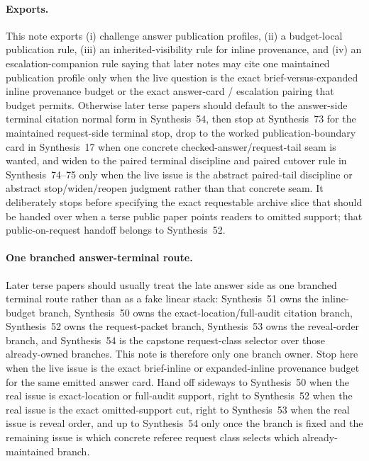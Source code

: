 \documentclass[11pt]{article}
\begin{document}
\paragraph{Exports.}
This note exports (i) challenge answer publication profiles, (ii) a budget-local publication rule, (iii) an inherited-visibility rule for inline provenance, and (iv) an escalation-companion rule saying that later notes may cite one maintained publication profile only when the live question is the exact brief-versus-expanded inline provenance budget or the exact answer-card / escalation pairing that budget permits. Otherwise later terse papers should default to the answer-side terminal citation normal form in Synthesis~54, then stop at Synthesis~73 for the maintained request-side terminal stop, drop to the worked publication-boundary card in Synthesis~17 when one concrete checked-answer/request-tail seam is wanted, and widen to the paired terminal discipline and paired cutover rule in Synthesis~74--75 only when the live issue is the abstract paired-tail discipline or abstract stop/widen/reopen judgment rather than that concrete seam. It deliberately stops before specifying the exact requestable archive slice that should be handed over when a terse public paper points readers to omitted support; that public-on-request handoff belongs to Synthesis~52.\cite{series:challengeanswerreviewmenus,series:publicrequestresponsepacketrefreshresponsepacketclosureverdicts,series:pairedterminalcitationdiscipline,series:pairedterminalcutoverrules}

\paragraph{One branched answer-terminal route.}
Later terse papers should usually treat the late answer side as one branched terminal route rather than as a fake linear stack: Synthesis~51 owns the inline-budget branch, Synthesis~50 owns the exact-location/full-audit citation branch, Synthesis~52 owns the request-packet branch, Synthesis~53 owns the reveal-order branch, and Synthesis~54 is the capstone request-class selector over those already-owned branches. This note is therefore only one branch owner. Stop here when the live issue is the exact brief-inline or expanded-inline provenance budget for the same emitted answer card. Hand off sideways to Synthesis~50 when the real issue is exact-location or full-audit support, right to Synthesis~52 when the real issue is the exact omitted-support cut, right to Synthesis~53 when the real issue is reveal order, and up to Synthesis~54 only once the branch is fixed and the remaining issue is which concrete referee request class selects which already-maintained branch.
\end{document}
